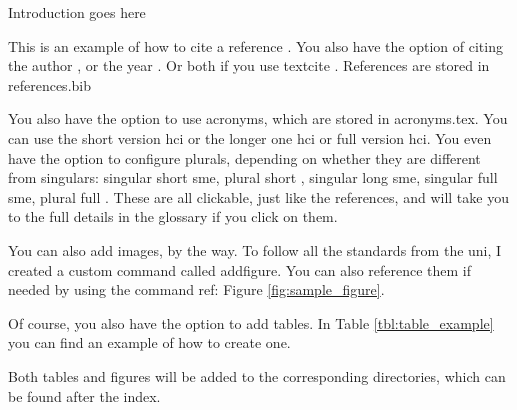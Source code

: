 Introduction goes here


This is an example of how to cite a reference
\parencite{digitalization-europe-goals}. You also have the option of citing the
author \citeauthor{digitalization-europe-goals}, or the year
\citeyear{digitalization-europe-goals}. Or both if you use textcite
\textcite{digitalization-europe-goals}. References are stored in references.bib

You also have the option to use acronyms, which are stored in acronyms.tex. You
can use the short version \acrshort{hci} or the longer one \acrlong{hci} or
full version \acrfull{hci}. You even have the option to configure plurals,
depending on whether they are different from singulars: singular short
\acrshort{sme}, plural short , singular long \acrlong{sme},
singular full \acrfull{sme}, plural full . These are all
clickable, just like the references, and will take you to the full details in
the glossary if you click on them.

You can also add images, by the way. To follow all the standards from the uni,
I created a custom command called addfigure. You can also reference them if
needed by using the command ref: Figure \ref{fig:sample_figure}.


Of course, you also have the option to add tables. In Table
\ref{tbl:table_example} you can find an example of how to create one.

\newpage


Both tables and figures will be added to the corresponding directories, which
can be found after the index.
